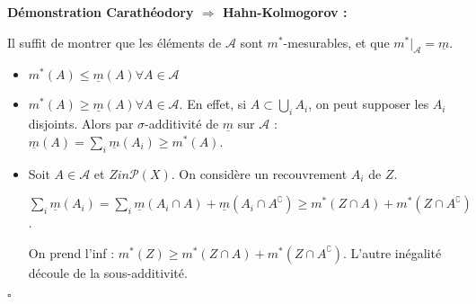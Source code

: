 \documentclass[10pt,a4paper,notitlepage ]{report}
\newcommand{\1}{\mathds 1}
\newcommand{\comp}[1]{#1^\complement}
\newcounter{th}
\newenvironment{demo}[1][]{

	\textbf{Démonstration #1 :}
}{\begin{flushright}
	$\square$
\end{flushright}
}
\begin{document}
\begin{demo}[Carathéodory $\Rightarrow$ Hahn-Kolmogorov]
	
	Il suffit de montrer que les éléments de $\mathcal A$ sont $m^*$-mesurables, et que $m^*|_{\mathcal A} = \underline m$.
	\begin{itemize}
		\item $m^*(A) \le \underline m(A) \forall A \in \mathcal A$
		\item $m^*(A) \ge \underline m (A) \forall A \in \mathcal A$. En effet, si $A \subset \underset i \bigcup A_i$, on peut supposer les $A_i$ disjoints. Alors par $\sigma$-additivité de $\underline m$ sur $\mathcal A$ : $\underline m(A) = \underset i \sum \underline m(A_i) \ge m^*(A)$.
		\item Soit $A \in \mathcal A$ et $Zin \mathcal P(X)$. On considère un recouvrement $A_i$ de $Z$.
		
		$\underset i \sum \underline m(A_i) = \underset i \sum \underline m (A_i \cap A) + \underline m(A_i \cap \comp A) \ge m^*(Z \cap A) + m^*(Z \cap \comp A)$.
		
		On prend l'inf : $m^*(Z) \ge m^*(Z \cap A) + m^*(Z \cap \comp A)$. L'autre inégalité découle de la sous-additivité.
	\end{itemize}
\end{demo}
\end{document}
